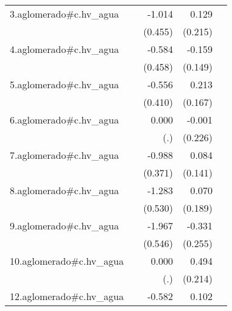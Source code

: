 {\begin{longtable}{l*{4}{D{.}{.}{-1}}}
\addlinespace
3.aglomerado#c.hv\_agua&                     &      -1.014\sym{*}  &       0.129         &                     \\
            &                     &     (0.455)         &     (0.215)         &                     \\
\addlinespace
4.aglomerado#c.hv\_agua&                     &      -0.584         &      -0.159         &                     \\
            &                     &     (0.458)         &     (0.149)         &                     \\
\addlinespace
5.aglomerado#c.hv\_agua&                     &      -0.556         &       0.213         &                     \\
            &                     &     (0.410)         &     (0.167)         &                     \\
\addlinespace
6.aglomerado#c.hv\_agua&                     &       0.000         &      -0.001         &                     \\
            &                     &         (.)         &     (0.226)         &                     \\
\addlinespace
7.aglomerado#c.hv\_agua&                     &      -0.988\sym{**} &       0.084         &                     \\
            &                     &     (0.371)         &     (0.141)         &                     \\
\addlinespace
8.aglomerado#c.hv\_agua&                     &      -1.283\sym{*}  &       0.070         &                     \\
            &                     &     (0.530)         &     (0.189)         &                     \\
\addlinespace
9.aglomerado#c.hv\_agua&                     &      -1.967\sym{***}&      -0.331         &                     \\
            &                     &     (0.546)         &     (0.255)         &                     \\
\addlinespace
10.aglomerado#c.hv\_agua&                     &       0.000         &       0.494\sym{*}  &                     \\
            &                     &         (.)         &     (0.214)         &                     \\
\addlinespace
12.aglomerado#c.hv\_agua&                     &      -0.582         &       0.102         &                     \\

\end{longtable}}
